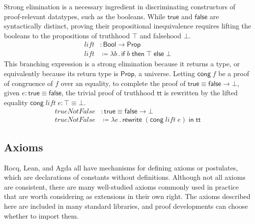 \documentclass{article}
\newcommand{\kw}[1]{\mathsf{#1}}
\begin{document}
Strong elimination is a necessary ingredient in discriminating constructors
of proof-relevant datatypes, such as the booleans.
While $\kw{true}$ and $\kw{false}$ are syntactically distinct,
proving their propositional inequivalence requires lifting the booleans
to the propositions of truthhood $\top$ and falsehood $\bot$.
%
\begin{align*}
  \mathit{lift} &: \kw{Bool} \to \kw{Prop} \\
  \mathit{lift} &\coloneqq \lambda b \mathpunct{.} \kw{if} \; b \; \kw{then} \; \top \; \kw{else} \; \bot
\end{align*}
%
This branching expression is a strong elimination because it returns a type,
or equivalently because its return type is $\kw{Prop}$, a universe.
Letting $\kw{cong} \; f$ be a proof of congruence of $f$ over an equality,
to complete the proof of $\kw{true} \equiv \kw{false} \to \bot$,
given $e : \kw{true} \equiv \kw{false}$,
the trivial proof of truthhood $\kw{tt}$ is rewritten by the lifted equality
$\kw{cong} \; \mathit{lift} \; e : \top \equiv \bot$.
%
\begin{align*}
  \mathit{trueNotFalse} &: \kw{true} \equiv \kw{false} \to \bot \\
  \mathit{trueNotFalse} &\coloneqq \lambda e \mathpunct{.} \kw{rewrite} \; (\kw{cong} \; \textit{lift} \; e) \; \kw{in} \; \kw{tt}
\end{align*}

\subsection{Axioms}

Rocq, Lean, and Agda all have mechanisms for defining axioms or postulates,
which are declarations of constants without definitions.
Although not all axioms are consistent,
there are many well-studied axioms commonly used in practice
that are worth considering as extensions in their own right.
The axioms described here are included in many standard libraries,
and proof developments can choose whether to import them.
\end{document}
